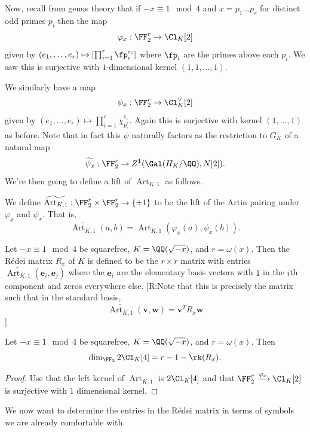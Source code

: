 \documentclass{lecturenotes}
\newcommand{\be}{\mathbf{e}}
\newcommand{\ross}[1]{{\color{red}[R:#1]}}
\newcommand{\Art}{\operatorname{Art}}
\numberwithin{equation}{section}
\begin{document}
Now, recall from genus theory that if $-x\equiv 1\mod 4$ and $x=p_1\dots p_r$ for distinct odd primes $p_i$ then the map
\[\varphi_x:\FF_2^r\to \Cl_K[2]\]
given by $(e_1,\dots,e_r)\mapsto \left[\prod_{i=1}^r\fp_i^{e_i}\right]$ where $\fp_i$ are the primes above each $p_i$.  We saw this is surjective with $1$-dimensional kernel $(1,1,\dots,1)$.

We similarly have a map
\[\psi_x:\FF_2^r\to \Cl_K^\vee[2]\]
given by $(e_1,\dots,e_r)\mapsto \prod_{i=1}^r\chi_{p_i^*}^{e_i}$.  Again this is surjective with kernel $(1,\dots,1)$ as before.  Note that in fact this $\psi$ naturally factors as the restriction to $G_K$ of a natural map
\[\widetilde{\psi_x}:\FF_2^r\to Z^1(\Gal(H_K/\QQ), N[2]).\]
We're then going to define a lift of $\Art_{K,1}$ as follows.

\begin{definition}
    We define $\widetilde{\Art_{K,1}}:\FF_2^r\times \FF_2^r\to \set{\pm 1}$ to be the lift of the Artin pairing under $\varphi_x$ and $\psi_x$.  That is,
    \[\widetilde{\Art_{K,1}}(a,b)=\Art_{K,1}(\varphi_x(a),\psi_x(b)).\]
\end{definition}

\begin{definition}
    Let $-x\equiv 1\mod 4$ be squarefree, $K=\QQ(\sqrt{-x})$, and $r=\omega(x)$.  Then the R\'edei matrix $R_x$ of $K$ is defined to be the $r\times r$ matrix with entries $\widetilde{\Art_{K,1}}(\be_i,\be_j)$ where the $\be_i$ are the elementary basis vectors with $1$ in the $i$th component and zeros everywhere else.  
    \ross{Note that this is precisely the matrix such that in the standard basis,
    \[\widetilde{\Art_{K,1}}(\mathbf{v},\mathbf{w})=\mathbf{v}^TR_x\mathbf{w}\]
    }
\end{definition}
\begin{theorem}\label{thm:4torsRedeiKernel}
    Let $-x\equiv 1\mod 4$ be squarefree, $K=\QQ(\sqrt{-x})$, and $r=\omega(x)$.  Then
    \[\dim_{\FF_2}2\Cl_K[4]=r-1-\rk(R_x).\]
\end{theorem}
\begin{proof}
    Use that the left kernel of $\Art_{K,1}$ is $2\Cl_K[4]$ and that $\FF_2^r\xrightarrow{\varphi_x} \Cl_K[2]$ is surjective with $1$ dimensional kernel.
\end{proof}

We now want to determine the entries in the R\'edei matrix in terms of symbols we are already comfortable with.
\end{document}

